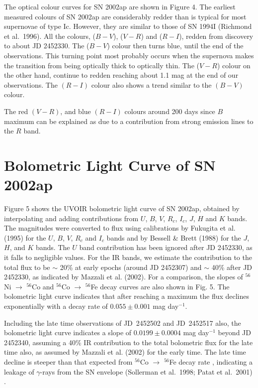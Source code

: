 The optical colour curves for SN 2002ap are shown in Figure 4. The earliest
measured colours of SN 2002ap are considerably redder than is typical for
most supernovae of type Ic. However, they are similar to those of SN 1994I 
(Richmond et 
al.\ 1996). All the colours, ($B-V$), ($V-R$) and ($R-I$), redden from 
discovery to about JD 2452330. The ($B-V$) colour then turns blue, until the 
end of the observations. 
This turning point most probably occurs when the supernova makes the transition from being
optically thick to optically thin. The ($V-R$) colour on the
other hand, continue to redden reaching about 1.1 mag at the end of our observations.
The $(R-I)$ colour also shows a trend similar to the $(B-V)$ colour. 

The red $(V-R)$, and blue $(R-I)$ colours around 200 days since $B$ maximum 
can be explained as due to a contribution from strong emission lines to the $R$ 
band.

\section{Bolometric Light Curve of SN 2002ap}

Figure 5 shows the UVOIR bolometric light curve of SN 2002ap, obtained
by interpolating and adding contributions from $U$, $B$, $V$, $R_c$, $I_c$, $J$,
 $H$ and $K$ bands. The magnitudes were converted to flux using calibrations by 
Fukugita et al. (1995) for the $U$, $B$, $V$, $R_c$ and $I_c$ bands and by 
Bessell \& Brett (1988) for the $J$, $H$, and $K$ bands. 
The $U$ band contribution has been ignored after JD 2452330, 
as it falls to negligible values.  For the IR bands, we estimate the
contribution to the total flux to be $\sim$ 20\% at early epochs 
(around JD 2452307) and $\sim$ 40\% after JD 2452330, as 
indicated by Mazzali et al. (2002).  
For a comparison, the slopes of $ {}^{56}$Ni $\rightarrow$ $ {}^{56}$Co and 
$ {}^{56}$Co $\rightarrow$ $ {}^{56}$Fe decay curves are also shown in Fig. 5.
The bolometric light curve indicates that after reaching a maximum the flux 
declines exponentially with a decay rate of $0.055\pm 0.001$ mag day$^{-1}$. 

Including the late time observations of JD\ 2452502 and JD\ 2452517 also, the bolometric light
curve indicates a slope of $0.0199\pm 0.0004$ mag day$^{-1}$ beyond JD\,2452340,
assuming a 40\% IR contribution to the total bolometric flux for the late time also, 
as assumed by Mazzali et al. (2002) for the early time.
The late time decline is steeper than that expected from ${}^{56}$Co $\rightarrow$ ${}^{56}$Fe decay rate
, indicating a leakage of $\gamma$-rays from the SN envelope (Sollerman et al.\ 1998; Patat et al.\ 2001) .


